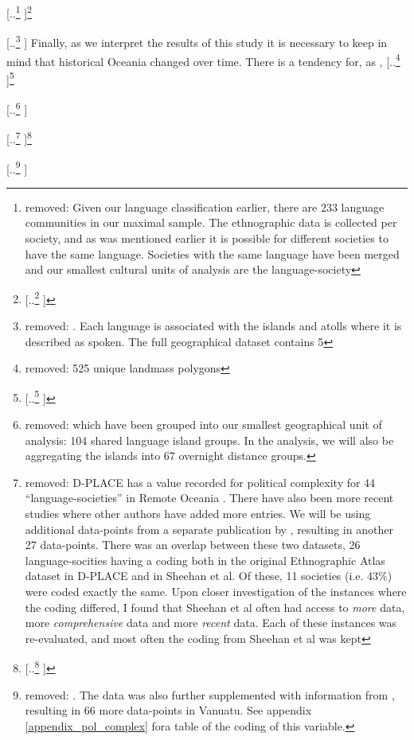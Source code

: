 \documentclass[unnumsec,webpdf,modern,medium]{oup-authoring-template}
\providecommand{\DIFaddtex}[1]{{\protect\color{blue} \sf #1}} %
\providecommand{\DIFdeltex}[1]{{\protect\color{red} [..\footnote{removed: #1} ]}} %
\providecommand{\DIFaddbegin}{} %
\providecommand{\DIFaddend}{} %
\providecommand{\DIFdelbegin}{} %
\providecommand{\DIFdelend}{} %
\providecommand{\DIFadd}[1]{\texorpdfstring{\DIFaddtex{#1}}{#1}} %
\providecommand{\DIFdel}[1]{\texorpdfstring{\DIFdeltex{#1}}{}} %
\newcommand{\DIFscaledelfig}{0.5}
\newlength{\DIFdelgraphicswidth} %
\newlength{\DIFdelgraphicsheight} %
\newcommand{\DIFaddincludegraphics}[2][]{{\color{blue}\fbox{\DIFOincludegraphics[#1]{#2}}}} %
\newcommand{\DIFdelincludegraphics}[2][]{%
\sbox{\DIFdelgraphicsbox}{\DIFOincludegraphics[#1]{#2}}%
\settoboxwidth{\DIFdelgraphicswidth}{\DIFdelgraphicsbox} %
\settoboxtotalheight{\DIFdelgraphicsheight}{\DIFdelgraphicsbox} %
\scalebox{\DIFscaledelfig}{%
\parbox[b]{\DIFdelgraphicswidth}{\usebox{\DIFdelgraphicsbox}\\[-\baselineskip] \rule{\DIFdelgraphicswidth}{0em}}\llap{\resizebox{\DIFdelgraphicswidth}{\DIFdelgraphicsheight}{%
\setlength{\unitlength}{\DIFdelgraphicswidth}%
\begin{picture}(1,1)%
\thicklines\linethickness{2pt} %
{\color[rgb]{1,0,0}\put(0,0){\framebox(1,1){}}}%
{\color[rgb]{1,0,0}\put(0,0){\line( 1,1){1}}}%
{\color[rgb]{1,0,0}\put(0,1){\line(1,-1){1}}}%
\end{picture}%
}\hspace*{3pt}}} %
} %
\DeclareRobustCommand{\DIFaddbegin}{\DIFOaddbegin \let\includegraphics\DIFaddincludegraphics} %
\DeclareRobustCommand{\DIFaddend}{\DIFOaddend \let\includegraphics\DIFOincludegraphics} %
\DeclareRobustCommand{\DIFdelbegin}{\DIFOdelbegin \let\includegraphics\DIFdelincludegraphics} %
\DeclareRobustCommand{\DIFdelend}{\DIFOaddend \let\includegraphics\DIFOincludegraphics} %
\begin{document}
\DIFdel{Given our language classification earlier, there are 233 language communities in our maximal sample. The ethnographic data is collected per society, and as was mentioned earlier it is possible for different societies to have the same language. Societies with the same language have been merged and our smallest cultural units of analysis are the language-society}\footnote{\DIFdel{American S\={a}moans and Upolu S\={a}moans were the only societies that needed merging in this fashion.}}%
\addtocounter{footnote}{-1}%
\DIFdel{. Each language is associated with the islands and atolls where it is described as spoken. The full geographical dataset contains 5}\DIFdelend \DIFaddbegin \DIFadd{Finally, as we interpret the results of this study it is necessary to keep in mind that historical Oceania changed over time. There is a tendency for, as \citet{meleisea1995}}\DIFaddend , \DIFdelbegin \DIFdel{525 unique landmass polygons}\footnote{\DIFdel{The total number of polygons in the geographical dataset is 9,750, but this includes New Guinea and uninhabited islands (Phoenix Islands for example). 5,525 is the number of unique polygons that can be associated with a community of Remote Oceania.}} %
\addtocounter{footnote}{-1}%
\DIFdel{which have been grouped into our smallest geographical unit of analysis: 104 shared language island groups. In the analysis, we will also be aggregating the islands into 67 overnight distance groups.
}%

\DIFdel{D-PLACE has a value recorded for political complexity for 44 ``language-societies'' in Remote Oceania . There have also been more recent studies where other authors have added more entries. We will be using additional data-points from a separate publication by \citet{sheehan2018coevolution}, resulting in another 27 data-points. There was an overlap between these two datasets, 26 language-socities having a coding both in the original Ethnographic Atlas dataset in D-PLACE and in Sheehan et al. Of these, 11 societies (i.e. 43\%) were coded exactly the same. Upon closer investigation of the instances where the coding differed, I found that Sheehan et al often had access to \textit{more} data, more \textit{comprehensive} data and more \textit{recent} data. Each of these instances was re-evaluated, and most often the coding from Sheehan et al was kept}\footnote{\DIFdel{I am grateful to Sheehan for very helpful personal correspondence during this process.}}%
\addtocounter{footnote}{-1}%
\DIFdel{. The data was also further supplemented with information from \citet[201]{bonnemaison1996graded}, resulting in 66 more data-points in Vanuatu. See appendix \ref{appendix_pol_complex} fora table of the coding of this variable.
}%
\end{document}
